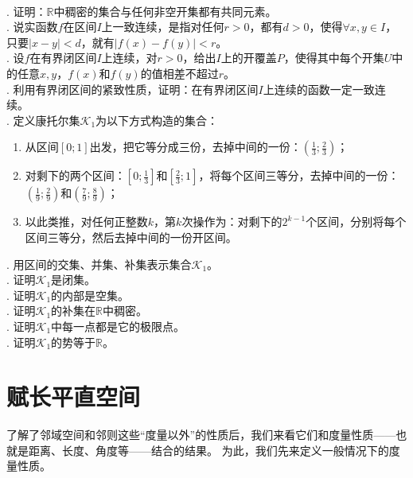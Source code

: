 \documentclass[12pt,UTF8,fontset=none]{ctexbook}
\begin{document}
\begin{xt}
    \mbox{} \\
    . 证明：$\mathbb{R}$中稠密的集合与任何非空开集都有共同元素。\\
    . 说实函数$f$在区间$I$上一致连续，是指对任何$r>0$，都有$d>0$，使得$\forall x, y\in I$，只要$|x-y|<d$，就有$|f(x) - f(y)| < r$。\\
    . 设$f$在有界闭区间$I$上连续，对$r>0$，给出$I$上的开覆盖$P$，使得其中每个开集$U$中的任意$x,y$，$f(x)$和$f(y)$的值相差不超过$r$。\\
    . 利用有界闭区间的紧致性质，证明：在有界闭区间$I$上连续的函数一定一致连续。\\
    . 定义康托尔集$\mathcal{K}_1$为以下方式构造的集合：
    \begin{enumerate}
        \item 从区间$[0;1]$出发，把它等分成三份，去掉中间的一份：$\left(\frac{1}{3};\frac{2}{3}\right)$；
        \item 对剩下的两个区间：$\left[0;\frac{1}{3}\right]$和$\left[\frac{2}{3};1\right]$，将每个区间三等分，去掉中间的一份：$\left(\frac{1}{9};\frac{2}{9}\right)$和$\left(\frac{7}{9};\frac{8}{9}\right)$；
        \item 以此类推，对任何正整数$k$，第$k$次操作为：对剩下的$2^{k-1}$个区间，分别将每个区间三等分，然后去掉中间的一份开区间。
    \end{enumerate}
    . 用区间的交集、并集、补集表示集合$\mathcal{K}_1$。\\
    . 证明$\mathcal{K}_1$是闭集。\\
    . 证明$\mathcal{K}_1$的内部是空集。\\
    . 证明$\mathcal{K}_1$的补集在$\mathbb{R}$中稠密。\\
    . 证明$\mathcal{K}_1$中每一点都是它的极限点。\\
    . 证明$\mathcal{K}_1$的势等于$\mathbb{R}$。
\end{xt}

\section{赋长平直空间}

了解了邻域空间和邻则这些“度量以外”的性质后，我们来看它们和度量性质——也就是距离、长度、角度等——结合的结果。
为此，我们先来定义一般情况下的度量性质。
\end{document}
